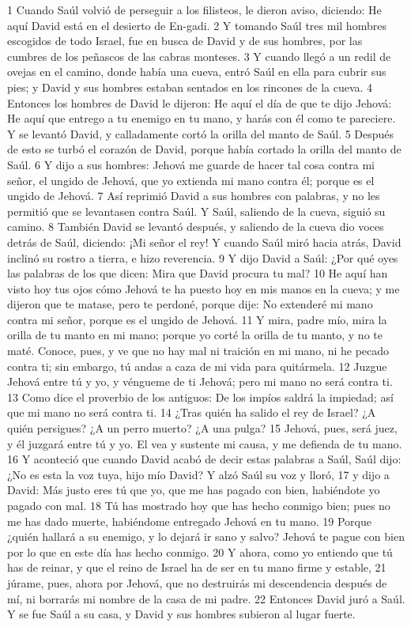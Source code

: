 1 Cuando Saúl volvió de perseguir a los filisteos, le dieron aviso, diciendo: He aquí David está en el desierto de En-gadi.
2 Y tomando Saúl tres mil hombres escogidos de todo Israel, fue en busca de David y de sus hombres, por las cumbres de los peñascos de las cabras monteses.
3 Y cuando llegó a un redil de ovejas en el camino, donde había una cueva, entró Saúl en ella para cubrir sus pies; y David y sus hombres estaban sentados en los rincones de la cueva.
4 Entonces los hombres de David le dijeron: He aquí el día de que te dijo Jehová: He aquí que entrego a tu enemigo en tu mano, y harás con él como te pareciere. Y se levantó David, y calladamente cortó la orilla del manto de Saúl.
5 Después de esto se turbó el corazón de David, porque había cortado la orilla del manto de Saúl.
6 Y dijo a sus hombres: Jehová me guarde de hacer tal cosa contra mi señor, el ungido de Jehová, que yo extienda mi mano contra él; porque es el ungido de Jehová.
7 Así reprimió David a sus hombres con palabras, y no les permitió que se levantasen contra Saúl. Y Saúl, saliendo de la cueva, siguió su camino.
8 También David se levantó después, y saliendo de la cueva dio voces detrás de Saúl, diciendo: ¡Mi señor el rey! Y cuando Saúl miró hacia atrás, David inclinó su rostro a tierra, e hizo reverencia.
9 Y dijo David a Saúl: ¿Por qué oyes las palabras de los que dicen: Mira que David procura tu mal?
10 He aquí han visto hoy tus ojos cómo Jehová te ha puesto hoy en mis manos en la cueva; y me dijeron que te matase, pero te perdoné, porque dije: No extenderé mi mano contra mi señor, porque es el ungido de Jehová.
11 Y mira, padre mío, mira la orilla de tu manto en mi mano; porque yo corté la orilla de tu manto, y no te maté. Conoce, pues, y ve que no hay mal ni traición en mi mano, ni he pecado contra ti; sin embargo, tú andas a caza de mi vida para quitármela.
12 Juzgue Jehová entre tú y yo, y véngueme de ti Jehová; pero mi mano no será contra ti.
13 Como dice el proverbio de los antiguos: De los impíos saldrá la impiedad; así que mi mano no será contra ti.
14 ¿Tras quién ha salido el rey de Israel? ¿A quién persigues? ¿A un perro muerto? ¿A una pulga?
15 Jehová, pues, será juez, y él juzgará entre tú y yo. El vea y sustente mi causa, y me defienda de tu mano.
16 Y aconteció que cuando David acabó de decir estas palabras a Saúl, Saúl dijo: ¿No es esta la voz tuya, hijo mío David? Y alzó Saúl su voz y lloró,
17 y dijo a David: Más justo eres tú que yo, que me has pagado con bien, habiéndote yo pagado con mal.
18 Tú has mostrado hoy que has hecho conmigo bien; pues no me has dado muerte, habiéndome entregado Jehová en tu mano.
19 Porque ¿quién hallará a su enemigo, y lo dejará ir sano y salvo? Jehová te pague con bien por lo que en este día has hecho conmigo.
20 Y ahora, como yo entiendo que tú has de reinar, y que el reino de Israel ha de ser en tu mano firme y estable,
21 júrame, pues, ahora por Jehová, que no destruirás mi descendencia después de mí, ni borrarás mi nombre de la casa de mi padre.
22 Entonces David juró a Saúl. Y se fue Saúl a su casa, y David y sus hombres subieron al lugar fuerte.

